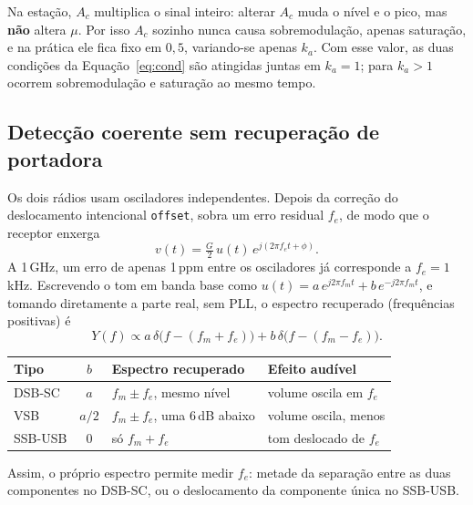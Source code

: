 \documentclass[11pt,a4paper]{article}
\begin{document}
Na estação, $A_c$ multiplica o sinal inteiro: alterar $A_c$ muda o nível e o
pico, mas \textbf{não} altera $\mu$. Por isso $A_c$ sozinho nunca causa
sobremodulação, apenas saturação, e na prática ele fica fixo em $0{,}5$,
variando-se apenas $k_a$. Com esse valor, as duas condições da
Equação~\eqref{eq:cond} são atingidas juntas em $k_a = 1$; para $k_a > 1$ ocorrem
sobremodulação e saturação ao mesmo tempo.

\subsection*{Detecção coerente sem recuperação de portadora}

Os dois rádios usam osciladores independentes. Depois da correção do
deslocamento intencional \texttt{offset}, sobra um erro residual $f_e$, de modo
que o receptor enxerga
\begin{equation}
      v(t) = \tfrac{G}{2}\,u(t)\,e^{j(2\pi f_e t + \phi)}.
\end{equation}
A 1\,GHz, um erro de apenas 1\,ppm entre os osciladores já corresponde a
$f_e = 1$\,kHz. Escrevendo o tom em banda base como
$u(t) = a\,e^{j2\pi f_m t} + b\,e^{-j2\pi f_m t}$, e tomando diretamente a parte
real, sem PLL, o espectro recuperado (frequências positivas) é
\begin{equation}
      Y(f) \propto a\,\delta\big(f - (f_m + f_e)\big) + b\,\delta\big(f - (f_m - f_e)\big).
      \label{eq:sempll}
\end{equation}
\begin{center}
      \begin{tabular}{l c l l}
            \toprule
            \textbf{Tipo} & \textbf{$b$} & \textbf{Espectro recuperado}    & \textbf{Efeito audível} \\
            \midrule
            DSB-SC        & $a$          & $f_m \pm f_e$, mesmo nível      & volume oscila em $f_e$  \\
            VSB           & $a/2$        & $f_m \pm f_e$, uma 6\,dB abaixo & volume oscila, menos    \\
            SSB-USB       & $0$          & só $f_m + f_e$                  & tom deslocado de $f_e$  \\
            \bottomrule
      \end{tabular}
\end{center}
Assim, o próprio espectro permite medir $f_e$: metade da separação entre as duas
componentes no DSB-SC, ou o deslocamento da componente única no SSB-USB.
\end{document}
